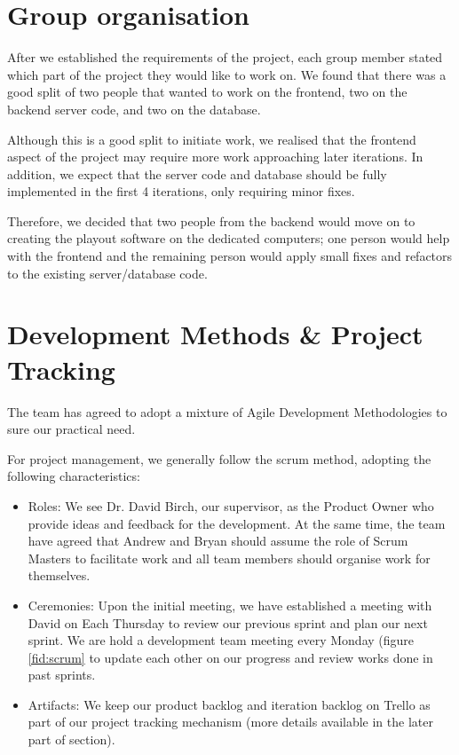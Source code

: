 \documentclass[a4paper]{article}
\begin{document}
\section{Group organisation} \label{sec:group}
After we established the requirements of the project, each group member stated
which part of the project they would like to work on. We found that there was a
good split of two people that wanted to work on the frontend, two on the backend
server code, and two on the database.

Although this is a good split to initiate work, we realised that the frontend 
aspect of the project may require more work approaching later iterations.
In addition, we  expect that the server code and database should be fully 
implemented in the first 4 iterations, only requiring minor fixes.

Therefore, we decided that two people from the backend would move on to creating
the playout software on the dedicated computers; one person would help with the
frontend and the remaining person would apply small fixes and refactors to the
existing server/database code. 


\section{Development Methods \& Project Tracking}
The team has agreed to adopt a mixture of Agile Development Methodologies to
sure our practical need.

For project management, we generally follow the scrum method, adopting the
following characteristics:
\begin{itemize}
  \item Roles: We see Dr. David Birch, our supervisor, as the Product Owner
        who provide ideas and feedback for the development. At the same time,
        the team have agreed that Andrew and Bryan should assume the role of
        Scrum Masters to facilitate work and all team members should organise
        work for themselves.
  \item Ceremonies: Upon the initial meeting, we have established a
        meeting with David on Each Thursday to review our previous sprint 
        and plan our next sprint. We are hold a development team
        meeting every Monday (figure \ref{fid:scrum} to update each other 
        on our progress and review works done in past sprints.
  \item Artifacts: We keep our product backlog and iteration backlog on
        Trello as part of our project tracking mechanism (more details
        available in the later part of section).
\end{itemize}
\end{document}

